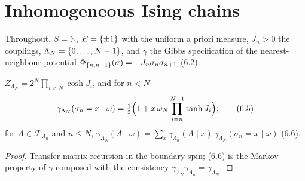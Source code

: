 \section{Inhomogeneous Ising chains}

Throughout, $S = \mathbb N$, $E = \left\{ \pm 1 \right\}$ with the uniform a priori measure, $J_n > 0$ the
couplings, $\Lambda_N = \left\{ 0, \dots, N-1 \right\}$, and $\gamma$ the Gibbs specification of the
nearest-neighbour potential $\Phi_{\left\{ n, n+1 \right\}}(\sigma) = -J_n \sigma_n \sigma_{n+1}$ (6.2).

\begin{lemma}[Georgii (6.5)--(6.6)]
    \label{lem:iic-6-5}
    \leanok

    $Z_{\Lambda_N} = 2^N \prod_{i < N} \cosh J_i$, and for $n < N$
    \[
        \gamma_{\Lambda_N}(\sigma_n = x \mid \omega)
        = \tfrac12\Bigl(1 + x\,\omega_N \prod_{i=n}^{N-1} \tanh J_i\Bigr) ; \tag{6.5}
    \]
    for $A \in \mathcal F_{\Lambda_n}$ and $n \leq N$,
    $\gamma_{\Lambda_N}(A \mid \omega) = \sum_x \gamma_{\Lambda_n}(A \mid x)\,\gamma_{\Lambda_N}(\sigma_n = x \mid \omega)$ (6.6).
\end{lemma}
\begin{proof}
    \leanok
    Transfer-matrix recursion in the boundary spin; (6.6) is the Markov property of $\gamma$
    composed with the consistency $\gamma_{\Lambda_N}\gamma_{\Lambda_n} = \gamma_{\Lambda_N}$.
\end{proof}


